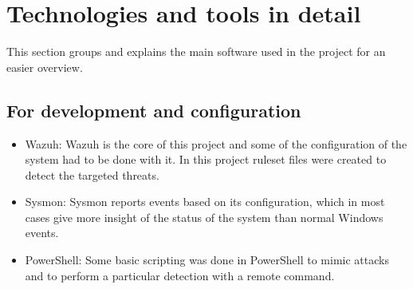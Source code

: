 \section{Technologies and tools in detail}
This section groups and explains the main software used in the project for an easier overview.

\subsection{For development and configuration}
\begin{itemize}
	\item Wazuh: Wazuh\cite{wazuh} is the core of this project and some of the configuration of the system had to be done with it. In this project ruleset files were created to detect the targeted threats.
	\item Sysmon: Sysmon\cite{sysmon} reports events based on its configuration, which in most cases give more insight of the status of the system than normal Windows events.
	\item PowerShell: Some basic scripting\cite{memoria_github} was done in PowerShell to mimic attacks and to perform a particular detection with a remote command.
\end{itemize}

